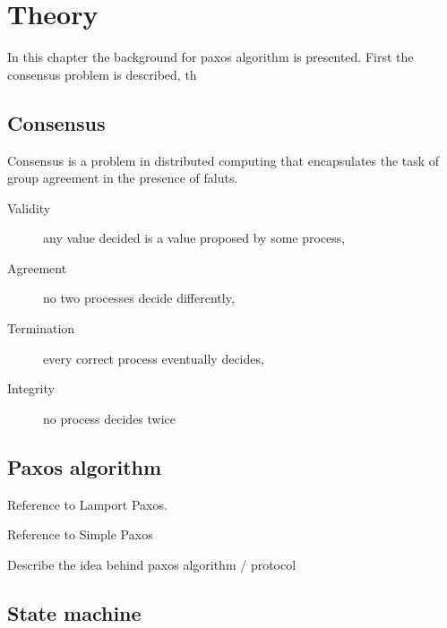\chapter{Theory}

%

In this chapter the background for paxos algorithm is presented. First the consensus problem is described, th

\section{Consensus}

Consensus is a problem in distributed computing that encapsulates the task of group agreement in the presence of faluts.

\begin{description}
    \item[Validity] any value decided is a value proposed by some process,
    \item[Agreement] no two processes decide differently,
    \item[Termination] every correct process eventually decides,
    \item[Integrity] no process decides twice
\end{description}

\section{Paxos algorithm}

Reference to Lamport Paxos.

Reference to Simple Paxos

Describe the idea behind paxos algorithm / protocol

\section{State machine}

